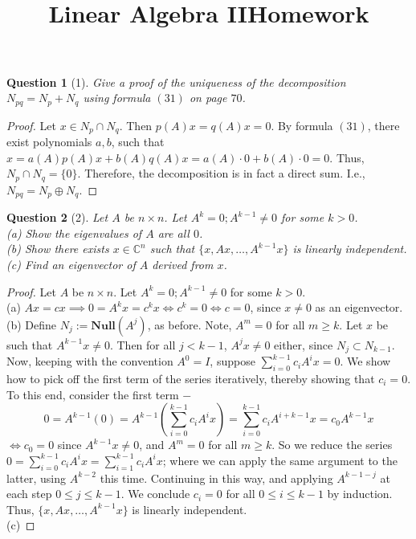 \documentclass[11pt]{article}
\title{\vspace{-50pt}
\Huge \name
\\\vspace{20pt}
\huge Linear Algebra II\hfill Homework \hw}
\author{}
\date{}
\theoremstyle{quest}
\newtheorem*{question}{Question}
\begin{document}
\maketitle

\begin{question}[1]
Give a proof of the uniqueness of the decomposition $N_{pq} = N_p + N_q$ using formula $(31)$ on page $70$.
\end{question}
\begin{proof}
Let $x \in N_p \cap N_q$. Then $p(A)x = q(A)x = 0$. By formula $(31)$, there exist polynomials $a, b$, such that $x = a(A)p(A)x + b(A)q(A)x = a(A) \cdot 0 + b(A) \cdot 0 = 0$. Thus, $N_p \cap N_q = \{0\}$. Therefore, the decomposition is in fact a direct sum. I.e., $N_{pq} = N_p \oplus N_q$.
\end{proof}
\begin{question}[2]
Let $A$ be $n \times n$. Let $A^k = 0; A^{k-1} \ne 0$ for some $k > 0$.
\\(a) Show the eigenvalues of $A$ are all $0$.
\\(b) Show there exists $x \in \mathbb{C}^n$ such that $\{x, Ax, \ldots, A^{k-1}x\}$ is linearly independent.
\\(c) Find an eigenvector of $A$ derived from $x$.
\end{question}
\begin{proof}
Let $A$ be $n \times n$. Let $A^k = 0; A^{k-1} \ne 0$ for some $k > 0$.
\\(a) $Ax = cx \implies 0 = A^k x = c^k x \iff c^k = 0 \iff c = 0$, since $x \ne 0$ as an eigenvector.
\\ (b) Define $N_j := \mathbf{Null}(A^j)$, as before. Note, $A^m = 0$ for all $m \ge k$. Let $x$ be such that $A^{k-1}x \ne 0$. Then for all $j < k-1$, $A^j x \ne 0$ either, since $N_j \subset N_{k-1}$. Now, keeping with the convention $A^0 = I$, suppose $\sum_{i = 0}^{k-1} c_i A^i x = 0$. We show how to pick off the first term of the series iteratively, thereby showing that $c_i = 0$. To this end, consider the first term $-$
$$0 = A^{k-1}(0) = A^{k-1}(\sum_{i = 0}^{k-1} c_i A^i x) = \sum_{i = 0}^{k-1} c_i A^{i+k-1} x = c_0 A^{k-1} x$$
$\iff c_0 = 0$ since $A^{k-1}x \ne 0$, and $A^m = 0$ for all $m \ge k$. So we reduce the series $0 = \sum_{i = 0}^{k-1} c_i A^i x = \sum_{i = 1}^{k-1} c_i A^i x$; where we can apply the same argument to the latter, using $A^{k-2}$ this time. Continuing in this way, and applying $A^{k-1-j}$ at each step $ 0 \le j \le k-1$. We conclude $c_i = 0$ for all $ 0 \le i \le k-1$ by induction. Thus, $\{x, Ax, \ldots, A^{k-1}x\}$ is linearly independent.
\\(c) 
\end{proof}
\end{document}
